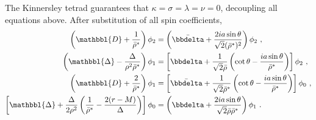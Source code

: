 The Kinnersley tetrad guarantees that $\kappa = \sigma = \lambda = \nu = 0$, decoupling all equations above. After substitution of all spin coefficients,
\begin{subequations}
    \begin{align}
        \label{eq3:phi21phi14Expand}
        \left( \mathbbl{D} + \frac{1}{\bar{\rho}^*} \right) \phi_2 &= 
        \left( \bar{\bbdelta} + \frac{2 i a \sin\theta}{\sqrt{2} (\bar{\rho}^*)^2} \right) \phi_2 ~,\\
        \label{eq3:phi12phi23Expand}
        \left( \mathbbl{\Delta} - \frac{\Delta}{\rho^2 \bar{\rho}^*} \right) \phi_1 &= 
        \left[ \bbdelta + \frac{1}{\sqrt{2} \bar{\rho}} \left( \cot\theta - \frac{i a \sin\theta}{\bar{\rho}^*} \right) \right] \phi_2 ~,\\
        \label{eq3:phi11phi04Expand}
        \left( \mathbbl{D} + \frac{2}{\bar{\rho}^*} \right) \phi_1 &=
        \left[ \bar{\bbdelta} + \frac{1}{\sqrt{2} \bar{\rho}^*}\left( \cot\theta - \frac{i a \sin\theta}{\bar{\rho}^*} \right) \right] \phi_0 ~, \\
        \label{eq3:phi02phi13Expand}
        \left[ \mathbbl{\Delta} + \frac{\Delta}{2 \rho^2} \left( \frac{1}{\bar{\rho}^*} - \frac{2(r-M)}{\Delta} \right) \right] \phi_0 &=
        \left(\bbdelta + \frac{2 i a \sin\theta}{\sqrt{2} \bar{\rho} \bar{\rho}^*}\right) \phi_1  ~.
    \end{align}
    \label{eq3:phiAllExpand}
\end{subequations}


